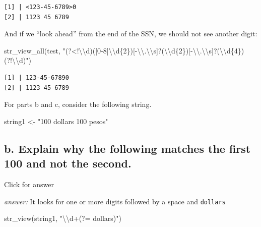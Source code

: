 \documentclass[
]{book}
\newenvironment{Shaded}{\begin{snugshade}}{\end{snugshade}}
\newcommand{\FunctionTok}[1]{\textcolor[rgb]{0.00,0.00,0.00}{#1}}
\newcommand{\NormalTok}[1]{#1}
\newcommand{\OtherTok}[1]{\textcolor[rgb]{0.56,0.35,0.01}{#1}}
\newcommand{\SpecialCharTok}[1]{\textcolor[rgb]{0.00,0.00,0.00}{#1}}
\newcommand{\StringTok}[1]{\textcolor[rgb]{0.31,0.60,0.02}{#1}}
\begin{document}
\begin{verbatim}
[1] | <123-45-6789>0
[2] | 1123 45 6789
\end{verbatim}

And if we ``look ahead'' from the end of the SSN, we should not see another digit:

\begin{Shaded}
\begin{Highlighting}[]
\FunctionTok{str\_view\_all}\NormalTok{(test, }\StringTok{"(?\textless{}!}\SpecialCharTok{\textbackslash{}\textbackslash{}}\StringTok{d)([0{-}8]}\SpecialCharTok{\textbackslash{}\textbackslash{}}\StringTok{d\{2\})[{-}}\SpecialCharTok{\textbackslash{}\textbackslash{}}\StringTok{.}\SpecialCharTok{\textbackslash{}\textbackslash{}}\StringTok{s]?(}\SpecialCharTok{\textbackslash{}\textbackslash{}}\StringTok{d\{2\})[{-}}\SpecialCharTok{\textbackslash{}\textbackslash{}}\StringTok{.}\SpecialCharTok{\textbackslash{}\textbackslash{}}\StringTok{s]?(}\SpecialCharTok{\textbackslash{}\textbackslash{}}\StringTok{d\{4\})(?!}\SpecialCharTok{\textbackslash{}\textbackslash{}}\StringTok{d)"}\NormalTok{)}
\end{Highlighting}
\end{Shaded}

\begin{verbatim}
[1] | 123-45-67890
[2] | 1123 45 6789
\end{verbatim}

For parts b and c, consider the following string.

\begin{Shaded}
\begin{Highlighting}[]
\NormalTok{string1 }\OtherTok{\textless{}{-}} \StringTok{"100 dollars 100 pesos"}
\end{Highlighting}
\end{Shaded}

\hypertarget{b.-explain-why-the-following-matches-the-first-100-and-not-the-second.}{%
\subsection{b. Explain why the following matches the first 100 and not the second.}\label{b.-explain-why-the-following-matches-the-first-100-and-not-the-second.}}

Click for answer

\emph{answer:} It looks for one or more digits followed by a space and \texttt{dollars}

\begin{Shaded}
\begin{Highlighting}[]
\FunctionTok{str\_view}\NormalTok{(string1, }\StringTok{"}\SpecialCharTok{\textbackslash{}\textbackslash{}}\StringTok{d+(?= dollars)"}\NormalTok{)}
\end{Highlighting}
\end{Shaded}
\end{document}

